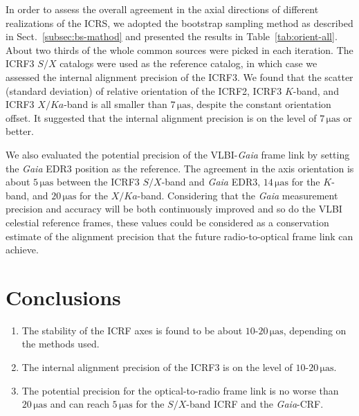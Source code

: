 \documentclass{aa}
\begin{document}
    In order to assess the overall agreement in the axial directions of different realizations of the ICRS, we adopted the bootstrap sampling method as described in Sect.~\ref{subsec:bs-mathod} and presented the results in Table~\ref{tab:orient-all}.
    About two thirds of the whole common sources were picked in each iteration.
    The ICRF3 $S/X$ catalogs were used as the reference catalog, in which case we assessed the internal alignment precision of the ICRF3.
    We found that the scatter (standard deviation) of relative orientation of the ICRF2, ICRF3 $K$-band, and ICRF3 $X/Ka$-band is all smaller than $\mathrm{7\,\mu as}$, despite the constant orientation offset.
    It suggested that the internal alignment precision is on the level of $\mathrm{7\,\mu as}$ or better.
    
    We also evaluated the potential precision of the VLBI-\textit{Gaia} frame link by setting the \textit{Gaia} EDR3 position as the reference.
    The agreement in the axis orientation is about $\mathrm{5\,\mu as}$ between the ICRF3 $S/X$-band and \textit{Gaia} EDR3, $\mathrm{14\,\mu as}$ for the $K$-band, and $\mathrm{20\,\mu as}$ for the $X/Ka$-band.
    Considering that the \textit{Gaia} measurement precision and accuracy will be both continuously improved and so do the VLBI celestial reference frames,
    these values could be considered as a conservation estimate of the alignment precision that the future radio-to-optical frame link can achieve.

%
%

\section{Conclusions}

   \begin{enumerate}
      \item The stability of the ICRF axes is found to be about $\mathrm{10}$-$\mathrm{20\,\mu as}$, depending on the methods used.
      \item The internal alignment precision of the ICRF3 is on the level of $\mathrm{10}$-$\mathrm{20\,\mu as}$.
      \item The potential precision for the optical-to-radio frame link is no worse than $\mathrm{20\,\mu as}$ and can reach $\mathrm{5\,\mu as}$ for the $S/X$-band ICRF and the \textit{Gaia}-CRF.
   \end{enumerate}
\end{document}

